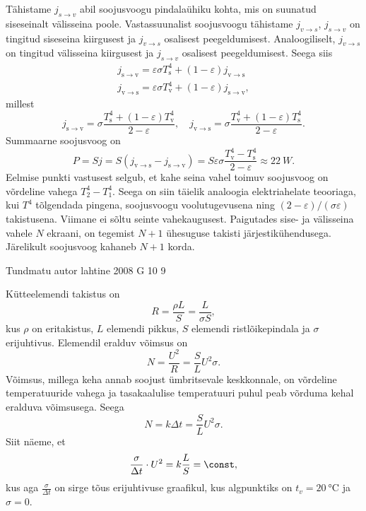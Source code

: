 \documentclass[11pt]{article}
\begin{document}
{{\ifSolution
\osa Tähistame $j_{s\rightarrow v}$ abil soojusvoogu pindalaühiku kohta, mis on suunatud siseseinalt välisseina poole. Vastassuunalist soojusvoogu tähistame $j_{v\rightarrow s}$, $j_{s\rightarrow v}$ on tingitud siseseina kiirgusest ja $j_{v\rightarrow s}$ osalisest peegeldumisest. Analoogiliselt, $j_{v\rightarrow s}$ on tingitud välisseina kiirgusest ja $j_{s\rightarrow v}$ osalisest peegeldumisest. Seega siis
\[
\begin{aligned}
{j_{\mathrm{s} \rightarrow \mathrm{v}}=\varepsilon \sigma T_{\mathrm{s}}^{4}+(1-\varepsilon) j_{\mathrm{v} \rightarrow \mathrm{s}}} \\ {j_{\mathrm{v} \rightarrow \mathrm{s}}=\varepsilon \sigma T_{\mathrm{v}}^{4}+(1-\varepsilon) j_{\mathrm{s} \rightarrow \mathrm{v}}},
\end{aligned}
\]
millest
\[
j_{\mathrm{s} \rightarrow \mathrm{v}}=\sigma \frac{T_{\mathrm{s}}^{4}+(1-\varepsilon) T_{\mathrm{v}}^{4}}{2-\varepsilon}, \quad j_{\mathrm{v} \rightarrow \mathrm{s}}=\sigma \frac{T_{\mathrm{v}}^{4}+(1-\varepsilon) T_{\mathrm{s}}^{4}}{2-\varepsilon}.
\]
Summaarne soojusvoog on
\[
P=Sj=S\left(j_{\mathrm{v} \rightarrow \mathrm{s}}-j_{\mathrm{s} \rightarrow \mathrm{v}}\right)=S\varepsilon \sigma \frac{T_{\mathrm{v}}^{4}-T_{\mathrm{s}}^{4}}{2-\varepsilon} \approx \SI{22}{W}.
\]
\osa Eelmise punkti vastusest selgub, et kahe seina vahel toimuv soojusvoog on võrdeline vahega $T_{2}^{4}-T_{1}^{4}$. Seega on siin täielik analoogia elektriahelate teooriaga, kui $T^4$ tõlgendada pingena, soojusvoogu voolutugevusena ning $(2-\varepsilon )/(\sigma \varepsilon)$ takistusena. Viimane ei sõltu seinte vahekaugusest. Paigutades sise- ja välisseina vahele $N$ ekraani, on tegemist $N + 1$ ühesuguse takisti järjestikühendusega. Järelikult soojusvoog kahaneb $N + 1$ korda.
\fi
}

{Tundmatu autor} %
{lahtine} %
{2008} %
{G 10} %
{9} %
{

\ifSolution
Kütteelemendi takistus on
\[
R=\frac{\rho L}{S}=\frac{L}{\sigma S},
\]
kus $\rho$ on eritakistus, $L$ elemendi pikkus, $S$ elemendi ristlõikepindala ja $\sigma$ erijuhtivus. Elemendil eralduv võimsus on
\[
N=\frac{U^{2}}{R}=\frac{S}{L} U^{2} \sigma.
\]
Võimsus, millega keha annab soojust ümbritsevale keskkonnale, on võrdeline temperatuuride vahega ja tasakaalulise temperatuuri puhul peab võrduma kehal eralduva võimsusega. Seega
\[
N=k \Delta t=\frac{S}{L} U^{2} \sigma.
\]
Siit näeme, et
\begin{equation} \label{2008-lahg-10:eq1}
\frac{\sigma}{\Delta t} \cdot U^{2}=k \frac{L}{S}=\const,
\end{equation}
kus aga $\frac{\sigma}{\Delta t}$
on sirge tõus erijuhtivuse graafikul, kus algpunktiks on $t_v = \SI{20}{\celsius}$ ja
$\sigma = \num{0}$.

}}
\end{document}
